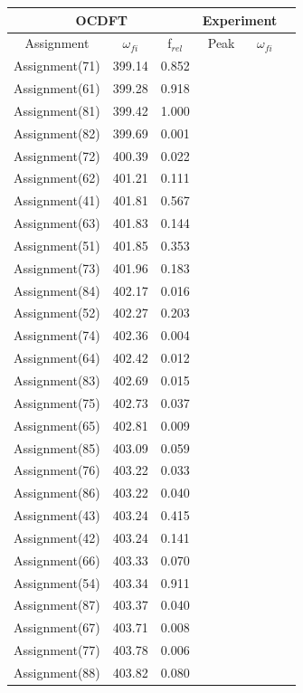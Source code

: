 \documentclass[12pt]{article}
\begin{document}
 \begin{table}
 \centering
    \begin{tabular}{c@{\hskip 0.22in}c@{\hskip 0.22in}c@{\hskip 0.52in}c@{\hskip 0.22in}c@{\hskip 0.22in}c}
     \hline
     \hline
   \multicolumn{3}{c}{OCDFT} &\multicolumn{2}{c}{Experiment} \\
   \hline
   Assignment & $\omega_{fi}$ & f$_{rel}$ & Peak &  $\omega_{fi}$   \\
   \hline
 Assignment(71) & 399.14 & 0.852 \\
 Assignment(61) & 399.28 & 0.918 \\
 Assignment(81) & 399.42 & 1.000 \\
 Assignment(82) & 399.69 & 0.001 \\
 Assignment(72) & 400.39 & 0.022 \\
 Assignment(62) & 401.21 & 0.111 \\
 Assignment(41) & 401.81 & 0.567 \\
 Assignment(63) & 401.83 & 0.144 \\
 Assignment(51) & 401.85 & 0.353 \\
 Assignment(73) & 401.96 & 0.183 \\
 Assignment(84) & 402.17 & 0.016 \\
 Assignment(52) & 402.27 & 0.203 \\
 Assignment(74) & 402.36 & 0.004 \\
 Assignment(64) & 402.42 & 0.012 \\
 Assignment(83) & 402.69 & 0.015 \\
 Assignment(75) & 402.73 & 0.037 \\
 Assignment(65) & 402.81 & 0.009 \\
 Assignment(85) & 403.09 & 0.059 \\
 Assignment(76) & 403.22 & 0.033 \\
 Assignment(86) & 403.22 & 0.040 \\
 Assignment(43) & 403.24 & 0.415 \\
 Assignment(42) & 403.24 & 0.141 \\
 Assignment(66) & 403.33 & 0.070 \\
 Assignment(54) & 403.34 & 0.911 \\
 Assignment(87) & 403.37 & 0.040 \\
 Assignment(67) & 403.71 & 0.008 \\
 Assignment(77) & 403.78 & 0.006 \\
 Assignment(88) & 403.82 & 0.080 \\

\end{tabular}
\end{table}
\end{document}
